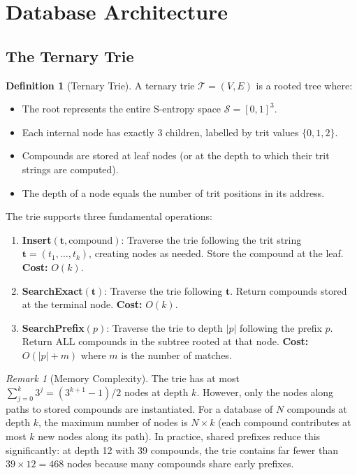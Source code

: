 \documentclass[11pt,twocolumn,a4paper]{article}
\theoremstyle{definition}
\newtheorem{definition}[theorem]{Definition}
\theoremstyle{remark}
\newtheorem{remark}[theorem]{Remark}
\newcommand{\Sspace}{\mathcal{S}}
\newcommand{\Trie}{\mathcal{T}}
\begin{document}
\section{Database Architecture}
\label{sec:architecture}

\subsection{The Ternary Trie}

\begin{definition}[Ternary Trie]
\label{def:trie}
A ternary trie $\Trie = (V, E)$ is a rooted tree where:
\begin{itemize}[nosep]
\item The root represents the entire S-entropy space $\Sspace = [0,1]^3$.
\item Each internal node has exactly 3 children, labelled by trit values $\{0, 1, 2\}$.
\item Compounds are stored at leaf nodes (or at the depth to which their trit strings are computed).
\item The depth of a node equals the number of trit positions in its address.
\end{itemize}
\end{definition}

The trie supports three fundamental operations:

\begin{enumerate}
\item \textbf{Insert}$(\mathbf{t}, \text{compound})$: Traverse the trie following the trit string $\mathbf{t} = (t_1, \ldots, t_k)$, creating nodes as needed. Store the compound at the leaf. \textbf{Cost:} $O(k)$.

\item \textbf{SearchExact}$(\mathbf{t})$: Traverse the trie following $\mathbf{t}$. Return compounds stored at the terminal node. \textbf{Cost:} $O(k)$.

\item \textbf{SearchPrefix}$(p)$: Traverse the trie to depth $|p|$ following the prefix $p$. Return ALL compounds in the subtree rooted at that node. \textbf{Cost:} $O(|p| + m)$ where $m$ is the number of matches.
\end{enumerate}

\begin{remark}[Memory Complexity]
The trie has at most $\sum_{j=0}^{k} 3^j = (3^{k+1} - 1)/2$ nodes at depth $k$. However, only the nodes along paths to stored compounds are instantiated. For a database of $N$ compounds at depth $k$, the maximum number of nodes is $N \times k$ (each compound contributes at most $k$ new nodes along its path). In practice, shared prefixes reduce this significantly: at depth 12 with 39 compounds, the trie contains far fewer than $39 \times 12 = 468$ nodes because many compounds share early prefixes.
\end{remark}
\end{document}
